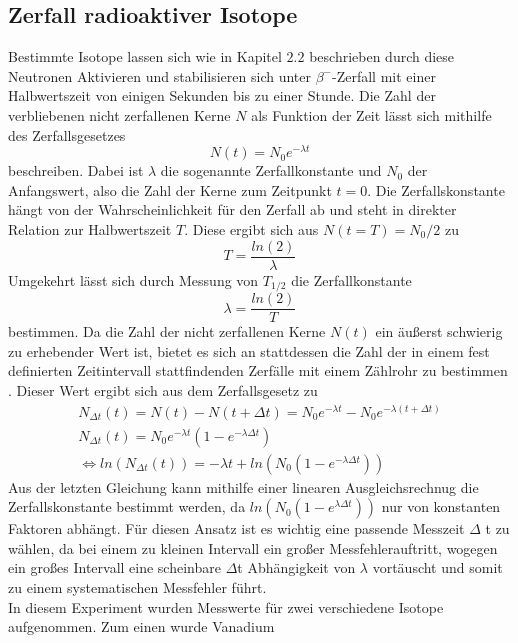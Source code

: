 \subsection{Zerfall radioaktiver Isotope}
Bestimmte Isotope lassen sich wie in Kapitel $2.2$ beschrieben durch diese Neutronen Aktivieren und 
stabilisieren sich unter $\beta^-$-Zerfall mit einer Halbwertszeit von einigen Sekunden bis zu einer 
Stunde. Die Zahl der verbliebenen nicht zerfallenen Kerne $N$ als Funktion der Zeit lässt sich mithilfe 
des Zerfallsgesetzes
\begin{equation}
N(t)=N_0e^{-\lambda t}
\end{equation}
beschreiben. Dabei ist $\lambda$ die sogenannte Zerfallkonstante und $N_0$ der Anfangswert, also die Zahl 
der Kerne zum Zeitpunkt $t=0$. Die Zerfallskonstante hängt von der Wahrscheinlichkeit für den Zerfall ab 
und steht in direkter Relation zur Halbwertszeit $T$. Diese ergibt sich aus $N(t=T)=N_0/2$ zu
\begin{equation}
T=\frac{ln(2)}{\lambda}
\end{equation}
Umgekehrt lässt sich durch Messung von $T_{1/2}$ die Zerfallkonstante
\begin{equation*}
\lambda=\frac{ln(2)}{T}
\end{equation*}
bestimmen. Da die Zahl der nicht zerfallenen Kerne $N(t)$ ein äußerst schwierig zu erhebender Wert ist, 
bietet es sich an  stattdessen die Zahl der in einem fest definierten Zeitintervall stattfindenden Zerfälle 
mit einem Zählrohr zu bestimmen . Dieser Wert ergibt sich aus dem Zerfallsgesetz zu
\begin{gather}
N_{\Delta t}(t)=N(t)-N(t + \Delta t)=N_0e^{-\lambda t}-N_0e^{-\lambda (t+\Delta t)} \\
N_{\Delta t}(t)=N_0e^{-\lambda t}(1-e^{-\lambda \Delta t} ) \\
\iff ln(N_{\Delta t}(t))=-\lambda t + ln(N_0(1-e^{-\lambda \Delta t}))
\end{gather}
Aus der letzten Gleichung kann mithilfe einer linearen Ausgleichsrechnug die Zerfallskonstante bestimmt 
werden, da $ln(N_0(1-e^{\lambda \Delta t}))$ nur von konstanten Faktoren abhängt. Für diesen Ansatz ist 
es wichtig eine passende Messzeit $\Delta$ t zu wählen, da bei einem zu kleinen Intervall ein großer 
Messfehlerauftritt, wogegen ein großes Intervall eine scheinbare $\Delta$t Abhängigkeit von $\lambda$ 
vortäuscht und somit zu einem systematischen Messfehler führt. \\
In diesem Experiment wurden Messwerte für zwei verschiedene Isotope aufgenommen. Zum einen wurde Vanadium 
